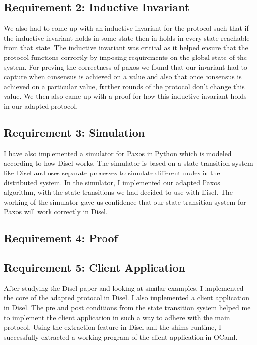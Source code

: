 \subsection{Requirement 2: Inductive Invariant}
We also had to come up with an inductive invariant for the protocol such that if
the inductive invariant holds in some state then in holds in every state reachable
from that state. The inductive invariant was critical as it helped ensure that
the protocol functions correctly by imposing requirements on the global state of
the system. For proving the correctness of paxos we found that our invariant had
to capture when consensus is achieved on a value and also that once consensus is
achieved on a particular value, further rounds of the protocol don’t change this
value. We then also came up with a proof for how this inductive invariant holds
in our adapted protocol.

\subsection{Requirement 3: Simulation}
I have also implemented a simulator for Paxos in Python which is modeled according
to how Disel works. The simulator is based on a state-transition system like Disel
and uses separate processes to simulate different nodes in the distributed system.
In the simulator, I implemented our adapted Paxos algorithm, with the state transitions
we had decided to use with Disel. The working of the simulator gave us confidence
that our state transition system for Paxos will work correctly in Disel.

\subsection{Requirement 4: Proof}

\subsection{Requirement 5: Client Application}
After studying the Disel paper and looking at similar examples, I implemented the
core of the adapted protocol in Disel. I also implemented a client application in
Disel. The pre and post conditions from the state transition system helped me to
implement the client application in such a way to adhere with the main protocol.
Using the extraction feature in Disel and the shims runtime, I successfully
extracted a working program of the client application in OCaml.
